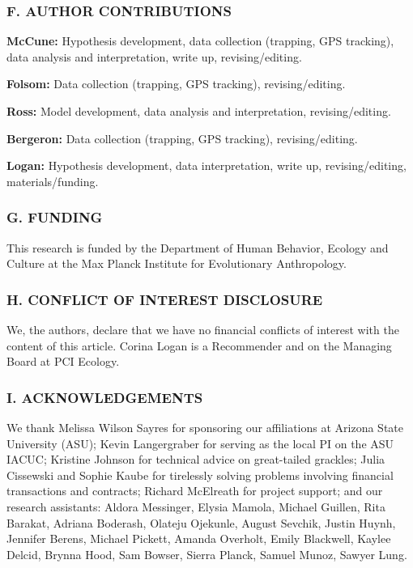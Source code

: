 \documentclass[
]{article}
\begin{document}
\hypertarget{f.-author-contributions}{%
\subsubsection{F. AUTHOR CONTRIBUTIONS}\label{f.-author-contributions}}

\textbf{McCune:} Hypothesis development, data collection (trapping, GPS
tracking), data analysis and interpretation, write up, revising/editing.

\textbf{Folsom:} Data collection (trapping, GPS tracking),
revising/editing.

\textbf{Ross:} Model development, data analysis and interpretation,
revising/editing.

\textbf{Bergeron:} Data collection (trapping, GPS tracking),
revising/editing.

\textbf{Logan:} Hypothesis development, data interpretation, write up,
revising/editing, materials/funding.

\hypertarget{g.-funding}{%
\subsubsection{G. FUNDING}\label{g.-funding}}

This research is funded by the Department of Human Behavior, Ecology and
Culture at the Max Planck Institute for Evolutionary Anthropology.

\hypertarget{h.-conflict-of-interest-disclosure}{%
\subsubsection{H. CONFLICT OF INTEREST
DISCLOSURE}\label{h.-conflict-of-interest-disclosure}}

We, the authors, declare that we have no financial conflicts of interest
with the content of this article. Corina Logan is a Recommender and on
the Managing Board at PCI Ecology.

\hypertarget{i.-acknowledgements}{%
\subsubsection{I. ACKNOWLEDGEMENTS}\label{i.-acknowledgements}}

We thank Melissa Wilson Sayres for sponsoring our affiliations at
Arizona State University (ASU); Kevin Langergraber for serving as the
local PI on the ASU IACUC; Kristine Johnson for technical advice on
great-tailed grackles; Julia Cissewski and Sophie Kaube for tirelessly
solving problems involving financial transactions and contracts; Richard
McElreath for project support; and our research assistants: Aldora
Messinger, Elysia Mamola, Michael Guillen, Rita Barakat, Adriana
Boderash, Olateju Ojekunle, August Sevchik, Justin Huynh, Jennifer
Berens, Michael Pickett, Amanda Overholt, Emily Blackwell, Kaylee
Delcid, Brynna Hood, Sam Bowser, Sierra Planck, Samuel Munoz, Sawyer
Lung.
\end{document}
